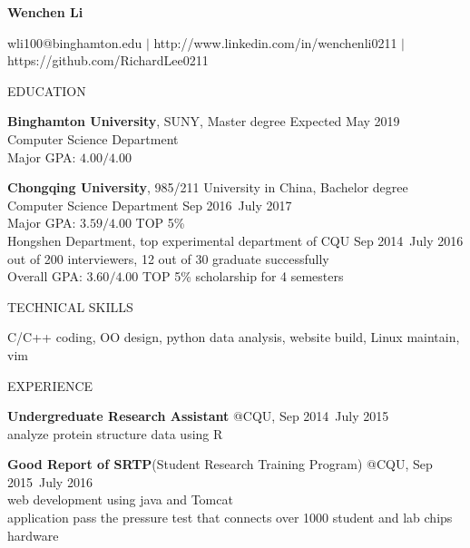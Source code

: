 \documentclass{article}
\begin{document}
\begin{center}
\large{\textbf{Wenchen Li} \par}
\end{center}

\noindent
wli100@binghamton.edu $|$
http://www.linkedin.com/in/wenchenli0211 $|$
https://github.com/RichardLee0211



\vskip 0.1in
\noindent
EDUCATION
\hrulefill

\noindent
\textbf{Binghamton University}, SUNY, Master degree
\dotfill Expected May 2019 \\
Computer Science Department \\
    \indent Major GPA: $4.00/4.00$

\noindent
\textbf{Chongqing University}, 985/211 University in China, Bachelor degree \\
Computer Science Department
\dotfill Sep 2016~July 2017 \\
    \indent Major GPA: $3.59/4.00$ \textbar TOP 5\%  \\
Hongshen Department, top experimental department of CQU
\dotfill Sep 2014~July 2016 \\
     out of 200 interviewers, 12 out of 30 graduate successfully \\
    \indent Overall GPA: $3.60/4.00$ \textbar  TOP 5\% \textbar  scholarship for 4 semesters


\vskip 0.1in
\noindent
TECHNICAL SKILLS
\hrulefill

C/C++ coding,
OO design,
python data analysis,
website build,
Linux maintain,
vim

\vskip 0.1in
\noindent
EXPERIENCE
\hrulefill

\noindent
\textbf{Undergreduate Research Assistant}
\dotfill @CQU, Sep 2014~July 2015 \\
    \indent analyze protein structure data using R

\noindent
\textbf{Good Report of SRTP}(Student Research Training Program)
\dotfill @CQU, Sep 2015~July 2016 \\
    \indent web development using java and Tomcat \\
    \indent application pass the pressure test that connects over 1000 student and lab chips hardware
\end{document}
